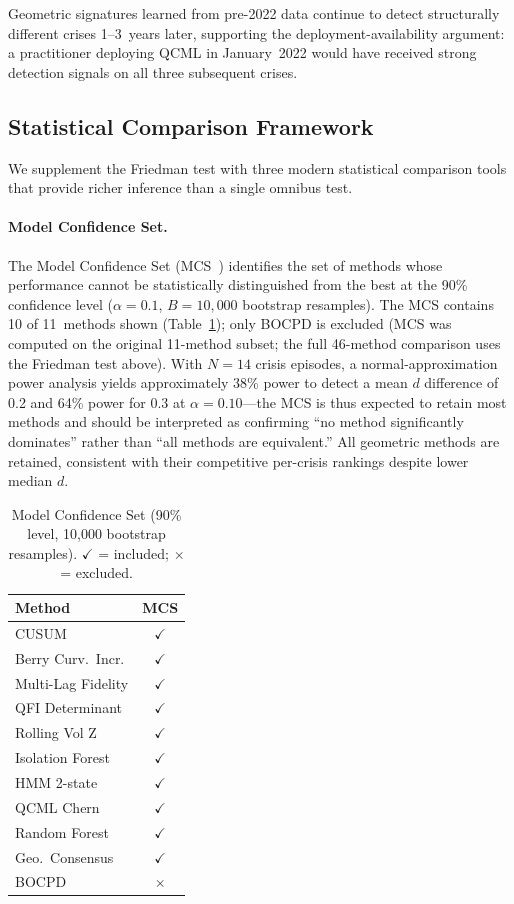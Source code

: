 \documentclass[3p]{elsarticle}
\begin{document}
Geometric signatures learned from pre-2022
data continue to detect structurally different crises 1--3~years later,
supporting the deployment-availability argument: a practitioner
deploying QCML in January~2022 would have received strong detection
signals on all three subsequent crises.

\subsection{Statistical Comparison Framework}\label{subsec:stat_comparison}

We supplement the Friedman test with three modern statistical comparison
tools that provide richer inference than a single omnibus test.

\paragraph{Model Confidence Set.}
The Model Confidence Set (MCS~\cite{hansen2011}) identifies the set of
methods whose performance cannot be statistically distinguished from the
best at the 90\% confidence level ($\alpha = 0.1$, $B = 10{,}000$ bootstrap
resamples).  The MCS contains 10 of 11~methods shown
(Table~\ref{tab:mcs}); only BOCPD is excluded (MCS was computed on
the original 11-method subset; the full 46-method comparison uses the
Friedman test above).
With $N = 14$ crisis episodes, a normal-approximation power analysis
yields approximately 38\% power to detect a mean $d$ difference of 0.2
and 64\% power for 0.3 at $\alpha = 0.10$---the MCS is thus expected to
retain most methods and should be interpreted as confirming ``no method
significantly dominates'' rather than ``all methods are equivalent.''
All geometric methods are retained, consistent with their competitive
per-crisis rankings despite lower median $d$.

\begin{table}[htbp]
\centering
\caption{Model Confidence Set (90\% level, 10,000 bootstrap resamples).
  $\checkmark$ = included; $\times$ = excluded.}
\label{tab:mcs}
\small
\begin{tabular}{lc}
\toprule
Method & MCS \\
\midrule
CUSUM               & $\checkmark$ \\
Berry Curv.\ Incr.   & $\checkmark$ \\
Multi-Lag Fidelity  & $\checkmark$ \\
QFI Determinant     & $\checkmark$ \\
Rolling Vol Z       & $\checkmark$ \\
Isolation Forest    & $\checkmark$ \\
HMM 2-state         & $\checkmark$ \\
QCML Chern          & $\checkmark$ \\
Random Forest       & $\checkmark$ \\
Geo.\ Consensus      & $\checkmark$ \\
\midrule
BOCPD               & $\times$ \\
\bottomrule
\end{tabular}
\end{table}
\end{document}
